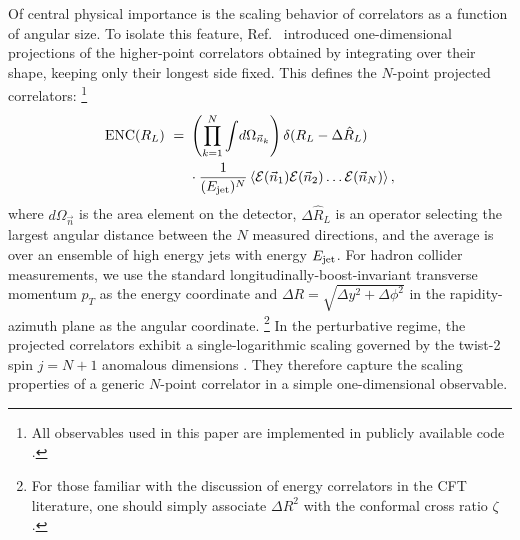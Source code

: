 \documentclass[aps,prl,twocolumn,showpacs,10pt,superscriptaddress,preprintnumbers,nofootinbib,longbibliography]{revtex4-1}
\newcommand{\nn}{\nonumber}
\begin{document}
Of central physical importance is the scaling behavior of correlators as a function of angular size.
%
To isolate this feature, Ref.~\cite{Chen:2020vvp} introduced one-dimensional projections of the higher-point correlators obtained by integrating over their shape, keeping only their longest side fixed.
%
This defines the $N$-point projected correlators:%
%
\footnote{All observables used in this paper are implemented in publicly available code \cite{EEC_github}.}
%
\begin{align}
  \label{eq:projection}
\hspace{-0.5cm}  \text{ENC}(R_L) \ = &\ \left(\prod_{k=1}^N \int \!  d\Omega_{\vec{n}_k} \right)
\delta (R_L - \Delta \hat R_L)\\
&\ \cdot \frac{1}{(E_{\rm jet})^N} \, \langle  
{\cal E}(\vec{n}_1) {\cal E}(\vec{n}_2)  \ldots 
{\cal E}( \vec{n}_N)   \rangle \,, \nn
\end{align}
%
where $d \Omega_{\vec n}$ is the area element on the detector, $\Delta \hat{R}_L$ is an operator selecting the largest angular distance between the $N$ measured directions, and the average is over an ensemble of high energy jets with energy $E_{\rm jet}$.
%
For hadron collider measurements, we use the standard longitudinally-boost-invariant transverse momentum $p_T$ as the energy coordinate and $\Delta R=\sqrt{\Delta y^2 + \Delta \phi^2}$ in the rapidity-azimuth plane as the angular coordinate.%
%
\footnote{For those familiar with the discussion of energy correlators in the CFT literature, one should simply associate $\Delta R^2$ with the conformal cross ratio $\zeta$.}
%
In the perturbative regime, the projected correlators exhibit a single-logarithmic scaling governed by the twist-2 spin $j=N+1$ anomalous dimensions \cite{Chen:2020vvp}.
%
They therefore capture the scaling properties of a generic $N$-point correlator in a simple one-dimensional observable. 
\end{document}
